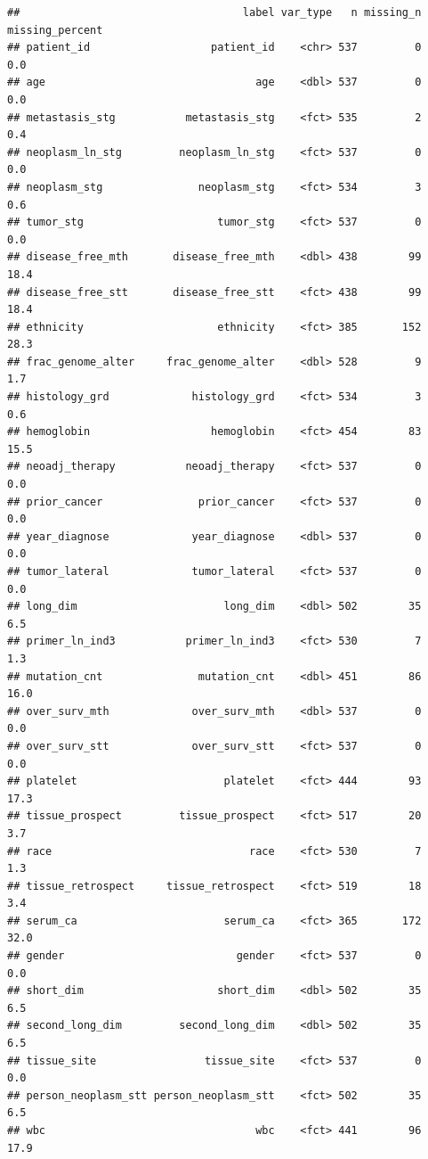 \documentclass[]{article}
\begin{document}
\begin{verbatim}
##                                   label var_type   n missing_n missing_percent
## patient_id                   patient_id    <chr> 537         0             0.0
## age                                 age    <dbl> 537         0             0.0
## metastasis_stg           metastasis_stg    <fct> 535         2             0.4
## neoplasm_ln_stg         neoplasm_ln_stg    <fct> 537         0             0.0
## neoplasm_stg               neoplasm_stg    <fct> 534         3             0.6
## tumor_stg                     tumor_stg    <fct> 537         0             0.0
## disease_free_mth       disease_free_mth    <dbl> 438        99            18.4
## disease_free_stt       disease_free_stt    <fct> 438        99            18.4
## ethnicity                     ethnicity    <fct> 385       152            28.3
## frac_genome_alter     frac_genome_alter    <dbl> 528         9             1.7
## histology_grd             histology_grd    <fct> 534         3             0.6
## hemoglobin                   hemoglobin    <fct> 454        83            15.5
## neoadj_therapy           neoadj_therapy    <fct> 537         0             0.0
## prior_cancer               prior_cancer    <fct> 537         0             0.0
## year_diagnose             year_diagnose    <dbl> 537         0             0.0
## tumor_lateral             tumor_lateral    <fct> 537         0             0.0
## long_dim                       long_dim    <dbl> 502        35             6.5
## primer_ln_ind3           primer_ln_ind3    <fct> 530         7             1.3
## mutation_cnt               mutation_cnt    <dbl> 451        86            16.0
## over_surv_mth             over_surv_mth    <dbl> 537         0             0.0
## over_surv_stt             over_surv_stt    <fct> 537         0             0.0
## platelet                       platelet    <fct> 444        93            17.3
## tissue_prospect         tissue_prospect    <fct> 517        20             3.7
## race                               race    <fct> 530         7             1.3
## tissue_retrospect     tissue_retrospect    <fct> 519        18             3.4
## serum_ca                       serum_ca    <fct> 365       172            32.0
## gender                           gender    <fct> 537         0             0.0
## short_dim                     short_dim    <dbl> 502        35             6.5
## second_long_dim         second_long_dim    <dbl> 502        35             6.5
## tissue_site                 tissue_site    <fct> 537         0             0.0
## person_neoplasm_stt person_neoplasm_stt    <fct> 502        35             6.5
## wbc                                 wbc    <fct> 441        96            17.9
\end{verbatim}
\end{document}
